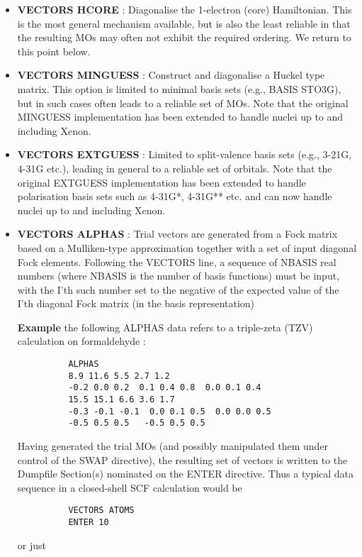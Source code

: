 \documentclass[11pt,fleqn]{article}
\begin{document}
\begin{itemize}
\item  {\bf VECTORS HCORE} : Diagonalise the 1-electron (core) 
Hamiltonian. This is the most
general mechanism available, but is also the least reliable
in that the resulting MOs may often not exhibit the required
ordering. We return to this point below.

\item  {\bf VECTORS MINGUESS} : Construct and diagonalise a 
Huckel type matrix. This option is
limited to minimal basis sets (e.g., BASIS STO3G), but in such cases
often leads to a reliable set of MOs.
Note that the original
MINGUESS implementation has been extended to handle
nuclei up to and including Xenon.

\item  {\bf VECTORS EXTGUESS} : Limited to split-valence 
basis sets (e.g., 3-21G, 4-31G etc.), leading
in general to a reliable set of orbitals. Note that the original
EXTGUESS implementation has been extended to handle
polarisation basis sets such as 4-31G*, 4-31G** etc. and
can now handle nuclei up to and including Xenon.

\item  {\bf VECTORS ALPHAS} : Trial vectors are generated from a 
Fock matrix based on a
Mulliken-type approximation together with a set of input diagonal
Fock elements. Following the VECTORS line, a sequence of NBASIS
real numbers (where NBASIS is the number of basis functions) must be
input, with the I'th such number set to the negative of the expected
value of the I'th diagonal Fock matrix (in the basis representation)


{\bf Example} the following ALPHAS data 
refers to a triple-zeta (TZV) calculation on formaldehyde :

{
\footnotesize
\begin{verbatim}
          ALPHAS
          8.9 11.6 5.5 2.7 1.2
          -0.2 0.0 0.2  0.1 0.4 0.8  0.0 0.1 0.4
          15.5 15.1 6.6 3.6 1.7
          -0.3 -0.1 -0.1  0.0 0.1 0.5  0.0 0.0 0.5
          -0.5 0.5 0.5   -0.5 0.5 0.5
\end{verbatim}
}
Having generated the trial MOs (and possibly manipulated  them under
control of the SWAP directive), the resulting set of vectors
is written to the Dumpfile Section(s) nominated on the ENTER
directive. Thus a typical data sequence in a closed-shell SCF
calculation would be

{
\footnotesize
\begin{verbatim}
          VECTORS ATOMS
          ENTER 10
\end{verbatim}
}
or just


\end{itemize}
\end{document}
